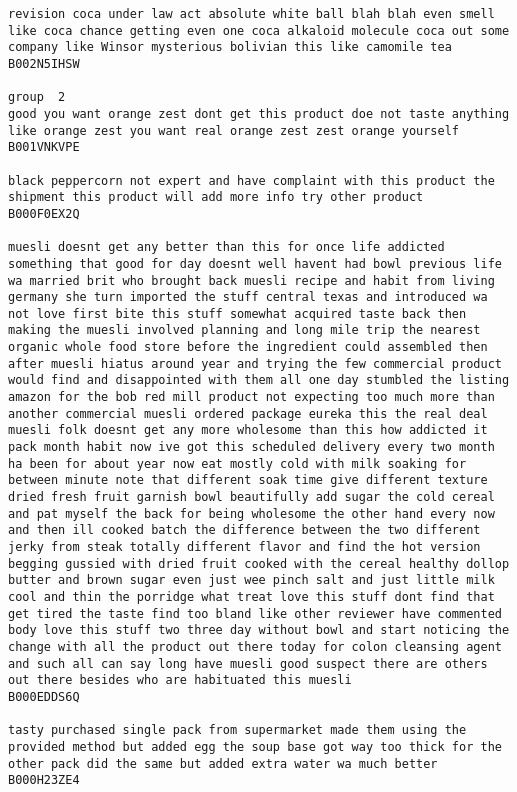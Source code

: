\documentclass[11pt]{article}
\begin{document}
\begin{Verbatim}[commandchars=\\\{\}]
revision coca under law act absolute white ball blah blah even smell like coca chance getting even one coca alkaloid molecule coca out some company like Winsor mysterious bolivian this like camomile tea
B002N5IHSW

group  2
good you want orange zest dont get this product doe not taste anything like orange zest you want real orange zest zest orange yourself
B001VNKVPE

black peppercorn not expert and have complaint with this product the shipment this product will add more info try other product
B000F0EX2Q

muesli doesnt get any better than this for once life addicted something that good for day doesnt well havent had bowl previous life wa married brit who brought back muesli recipe and habit from living germany she turn imported the stuff central texas and introduced wa not love first bite this stuff somewhat acquired taste back then making the muesli involved planning and long mile trip the nearest organic whole food store before the ingredient could assembled then after muesli hiatus around year and trying the few commercial product would find and disappointed with them all one day stumbled the listing amazon for the bob red mill product not expecting too much more than another commercial muesli ordered package eureka this the real deal muesli folk doesnt get any more wholesome than this how addicted it pack month habit now ive got this scheduled delivery every two month ha been for about year now eat mostly cold with milk soaking for between minute note that different soak time give different texture dried fresh fruit garnish bowl beautifully add sugar the cold cereal and pat myself the back for being wholesome the other hand every now and then ill cooked batch the difference between the two different jerky from steak totally different flavor and find the hot version begging gussied with dried fruit cooked with the cereal healthy dollop butter and brown sugar even just wee pinch salt and just little milk cool and thin the porridge what treat love this stuff dont find that get tired the taste find too bland like other reviewer have commented body love this stuff two three day without bowl and start noticing the change with all the product out there today for colon cleansing agent and such all can say long have muesli good suspect there are others out there besides who are habituated this muesli
B000EDDS6Q

tasty purchased single pack from supermarket made them using the provided method but added egg the soup base got way too thick for the other pack did the same but added extra water wa much better
B000H23ZE4


\end{Verbatim}
\end{document}
